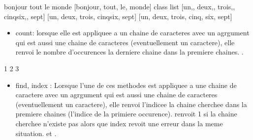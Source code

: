 \documentclass[letterpaper,10pt,french]{sphinxmanual}
\begin{document}
\begin{sphinxVerbatim}[commandchars=\\\{\}]
bonjour tout le monde
[\PYGZsq{}bonjour\PYGZsq{}, \PYGZsq{}tout\PYGZsq{}, \PYGZsq{}le\PYGZsq{}, \PYGZsq{}monde\PYGZsq{}]
\PYGZlt{}class \PYGZsq{}list\PYGZsq{}\PYGZgt{}
[\PYGZsq{}un,\PYGZsq{}, \PYGZsq{}deux,\PYGZsq{}, \PYGZsq{}trois,\PYGZsq{}, \PYGZsq{}cinq\PYGZhy{}six,\PYGZsq{}, \PYGZsq{}sept\PYGZsq{}]
[\PYGZsq{}un\PYGZsq{}, \PYGZsq{} deux\PYGZsq{}, \PYGZsq{} trois\PYGZsq{}, \PYGZsq{} cinq\PYGZhy{}six\PYGZsq{}, \PYGZsq{} sept\PYGZsq{}]
[\PYGZsq{}un, deux, trois, cinq\PYGZsq{}, \PYGZsq{}six, sept\PYGZsq{}]
\end{sphinxVerbatim}
\begin{itemize}
\item {} 
\sphinxAtStartPar
count: lorsque elle est appliquee a un chaine de caracteres avec un agrgument qui est aussi une chaine de caracteres (eventuellement un caractere), elle renvoi le nombre d’occurences la derniere chaine dans la premiere chaines. .

\end{itemize}

\begin{sphinxVerbatim}[commandchars=\\\{\}]
  


\end{sphinxVerbatim}

\begin{sphinxVerbatim}[commandchars=\\\{\}]
1
2
3
\end{sphinxVerbatim}
\begin{itemize}
\item {} 
\sphinxAtStartPar
find, index : Lorsque l’une de ces methodes est appliquee a une chaine de caractere avec un agrgument qui est aussi une chaine de caracteres (eventuellement un caractere), elle renvoi l’indicee  la chaine cherchee dans la premiere chaines (l’indice de la primiere occurence).  renvoit \sphinxhyphen{}1 si la chaine cherchee n’existe pas alors que index revoit une erreur dans la meme situation.  et .

\end{itemize}
\end{document}
